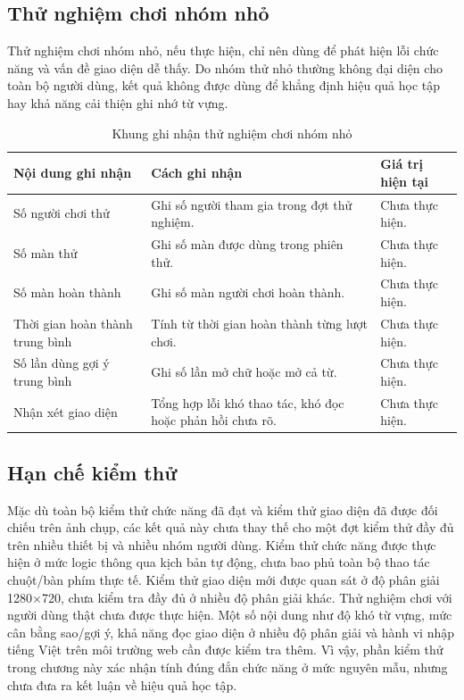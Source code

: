 \documentclass[../DoAn.tex]{subfiles}
\begin{document}
\subsection{Thử nghiệm chơi nhóm nhỏ}

Thử nghiệm chơi nhóm nhỏ, nếu thực hiện, chỉ nên dùng để phát hiện lỗi chức năng và vấn đề giao diện dễ thấy. Do nhóm thử nhỏ thường không đại diện cho toàn bộ người dùng, kết quả không được dùng để khẳng định hiệu quả học tập hay khả năng cải thiện ghi nhớ từ vựng.

\begin{table}[H]
\centering
\small
\begin{tabularx}{\textwidth}{|>{\RaggedRight\arraybackslash}p{4.2cm}|>{\RaggedRight\arraybackslash}p{4.2cm}|>{\RaggedRight\arraybackslash}X|}
\hline
\textbf{Nội dung ghi nhận} & \textbf{Cách ghi nhận} & \textbf{Giá trị hiện tại} \\ \hline
Số người chơi thử & Ghi số người tham gia trong đợt thử nghiệm. & Chưa thực hiện. \\ \hline
Số màn thử & Ghi số màn được dùng trong phiên thử. & Chưa thực hiện. \\ \hline
Số màn hoàn thành & Ghi số màn người chơi hoàn thành. & Chưa thực hiện. \\ \hline
Thời gian hoàn thành trung bình & Tính từ thời gian hoàn thành từng lượt chơi. & Chưa thực hiện. \\ \hline
Số lần dùng gợi ý trung bình & Ghi số lần mở chữ hoặc mở cả từ. & Chưa thực hiện. \\ \hline
Nhận xét giao diện & Tổng hợp lỗi khó thao tác, khó đọc hoặc phản hồi chưa rõ. & Chưa thực hiện. \\ \hline
\end{tabularx}
\caption{Khung ghi nhận thử nghiệm chơi nhóm nhỏ}
\label{table:small_playtest_frame}
\end{table}

\subsection{Hạn chế kiểm thử}

Mặc dù toàn bộ kiểm thử chức năng đã đạt và kiểm thử giao diện đã được đối chiếu trên ảnh chụp, các kết quả này chưa thay thế cho một đợt kiểm thử đầy đủ trên nhiều thiết bị và nhiều nhóm người dùng. Kiểm thử chức năng được thực hiện ở mức logic thông qua kịch bản tự động, chưa bao phủ toàn bộ thao tác chuột/bàn phím thực tế. Kiểm thử giao diện mới được quan sát ở độ phân giải 1280$\times$720, chưa kiểm tra đầy đủ ở nhiều độ phân giải khác. Thử nghiệm chơi với người dùng thật chưa được thực hiện. Một số nội dung như độ khó từ vựng, mức cân bằng sao/gợi ý, khả năng đọc giao diện ở nhiều độ phân giải và hành vi nhập tiếng Việt trên môi trường web cần được kiểm tra thêm. Vì vậy, phần kiểm thử trong chương này xác nhận tính đúng đắn chức năng ở mức nguyên mẫu, nhưng chưa đưa ra kết luận về hiệu quả học tập.
\end{document}
